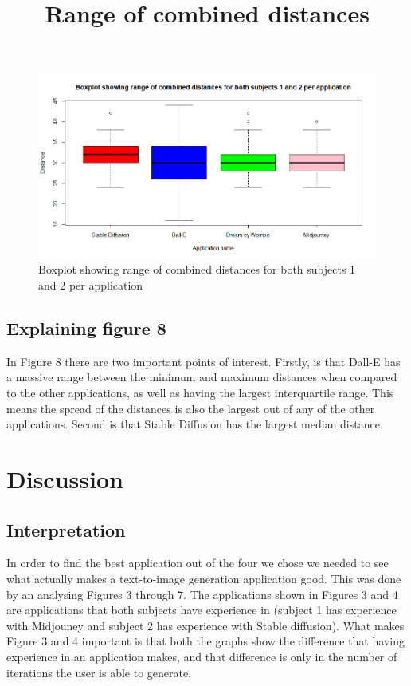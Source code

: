 \documentclass[]{report}
\begin{document}
	\begin{figure}[!htbp]
		\centering
		\bfseries
		\title{Range of combined distances}
		\includegraphics[width=1\linewidth, trim=0 0 0 50, clip]{boxplotWithAllData}
		\caption{Boxplot showing range of combined distances for both subjects 1 and 2 per application}
		\label{fig:boxplotwithalldata}
	\end{figure}
	\pagebreak
	\subsection{Explaining figure 8}
	
	In Figure 8 there are two important points of interest. Firstly, is that Dall-E has a massive range between the minimum and maximum distances when compared to the other applications, as well as having the largest interquartile range. This means the spread of the distances is also the largest out of any of the other applications. Second is that Stable Diffusion has the largest median distance. 
	
	
	\pagebreak
	\section{Discussion}
	
	\subsection{Interpretation}
	
	In order to find the best application out of the four we chose we needed to see what actually makes a text-to-image generation application good. This was done by an analysing Figures 3 through 7. The applications shown in Figures 3 and 4 are applications that both subjects have experience in (subject 1 has experience with Midjouney and subject 2 has experience with Stable diffusion). What makes Figure 3 and 4 important is that both the graphs show the difference that having experience in an application makes, and that difference is only in the number of iterations the user is able to generate. 
	
\end{document}
